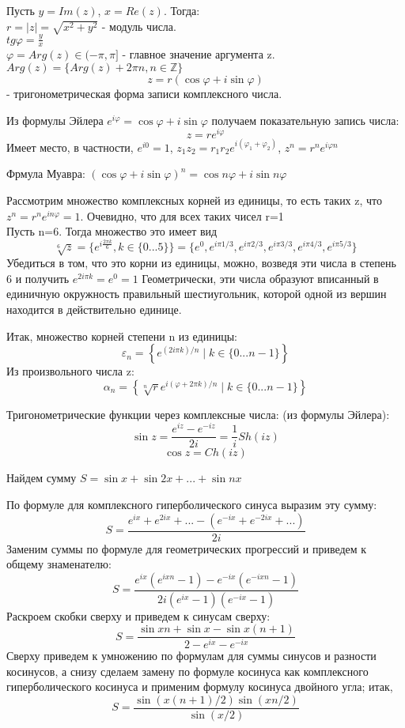 Пусть $y=Im(z)$, $x=Re(z)$. Тогда:\\
$r=|z|=\sqrt{x^2+y^2}$ - модуль числа. \\
$tg \varphi = \frac{y}{x}$\\
$\varphi=Arg(z)\in(-\pi,\pi]$ - главное значение аргумента z.\\
$Arg(z)=\{Arg(z)+2\pi n, n\in\mathbb Z\}$\\
$$\boxed{z=r(\cos\varphi+i\sin\varphi)}$$ -
тригонометрическая форма записи комплексного числа.

Из формулы Эйлера $e^{i\varphi}=\cos\varphi+i\sin\varphi$
получаем показательную запись числа: $$\boxed{z=re^{i\varphi}}$$
Имеет место, в частности,
$e^{i0}=1$, $z_1z_2=r_1r_2e^{i(\varphi_1+\varphi_2)}$, $z^n=r^ne^{i\varphi n}$

Фрмула Муавра: $(\cos\varphi+i\sin\varphi)^n=\cos{n\varphi}+i\sin{n\varphi}$

Рассмотрим множество комплексных корней из единицы, то есть таких z,
что $z^n=r^ne^{in\varphi}=1$. 
Очевидно, что для всех таких чисел r=1\\
Пусть n=6. Тогда множество это имеет вид
$$\sqrt[6]{z}=\{e^{i\frac {2\pi k}{6}}, k\in\{0...5\}\}=\{e^0, e^{i\pi1/3},
e^{i\pi2/3}, e^{i\pi3/3}, e^{i\pi4/3}, e^{i\pi5/3} \}$$
Убедиться в том, что это корни из единицы, можно, возведя эти числа в степень
6 и получить $e^{2i\pi k}=e^0=1$
Геометрически, эти числа образуют вписанный в единичную окружность правильный 
шестиугольник, которой одной из вершин находится в действительно единице.

Итак, множество корней степени n из единицы:
$$\varepsilon_n=\left\{e^{(2i\pi k)/n}\mid k\in\{0...n-1\}\right\}$$
Из произвольного числа z:
$$\alpha_n=\left\{\sqrt[n]{r}e^{i(\varphi+2\pi k)/n}\mid
k\in\{0...n-1\}\right\}$$

Тригонометрические функции через комплексные числа: (из формулы
Эйлера):\\
$$\sin z=\frac{e^{iz}-e^{-iz}}{2i}=\frac{1}{i}Sh(iz)$$
$$\cos z=Ch(iz)$$
\begin{example}
Найдем сумму $S=\sin x + \sin{2x}+...+\sin{nx}$
\end{example}
По формуле для комплексного гиперболического синуса выразим эту сумму:
$$S=\frac{e^{ix}+e^{2ix}+...-(e^{-ix}+e^{-2ix}+...)}{2i}$$
Заменим суммы по формуле для геометрических прогрессий и приведем к общему
знаменателю: 
$$S=\frac{e^{ix}(e^{ixn}-1)-e^{-ix}(e^{-ixn}-1)}{2i(e^{ix}-1)(e^{-ix}-1)}$$
Раскроем скобки сверху и приведем к синусам сверху:
$$S=\frac{\sin{xn}+\sin x-\sin{x(n+1)}}{2-e^{ix}-e^{-ix}}$$
Сверху приведем к умножению по формулам для суммы синусов и разности 
косинусов, а снизу сделаем замену по формуле косинуса как комплексного
гиперболического косинуса и применим формулу косинуса двойного угла; итак,
$$S=\frac{\sin(x(n+1)/2)\sin(xn/2)}{\sin(x/2)}$$

